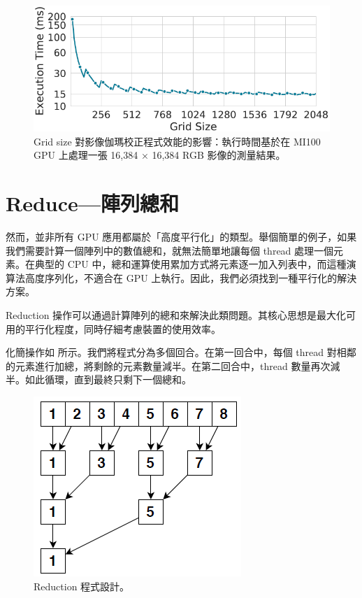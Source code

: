 \begin{figure}[h]
    \centering
    \includegraphics[width=0.9\linewidth]{FileAusiliari/Screenshots/Figure8-4.png}
    \caption{Grid size 對影像伽瑪校正程式效能的影響：執行時間基於在 MI100 GPU 上處理一張 16,384 × 16,384 RGB 影像的測量結果。}
    \label{fig:GridSize}
\end{figure}

\section{Reduce—陣列總和}
然而，並非所有 GPU 應用都屬於「高度平行化」的類型。舉個簡單的例子，如果我們需要計算一個陣列中的數值總和，就無法簡單地讓每個 thread 處理一個元素。在典型的 CPU 中，總和運算使用累加方式將元素逐一加入列表中，而這種演算法高度序列化，不適合在 GPU 上執行。因此，我們必須找到一種平行化的解決方案。

Reduction 操作可以通過計算陣列的總和來解決此類問題。其核心思想是最大化可用的平行化程度，同時仔細考慮裝置的使用效率。

化簡操作如  所示。我們將程式分為多個回合。在第一回合中，每個 thread 對相鄰的元素進行加總，將剩餘的元素數量減半。在第二回合中，thread 數量再次減半。如此循環，直到最終只剩下一個總和。

\begin{figure}[h]
    \centering
    \includegraphics[width=0.4\linewidth]{FileAusiliari/Screenshots/Figure8-5.png}
    \caption{Reduction 程式設計。}
    \label{fig:reduce}
\end{figure}

